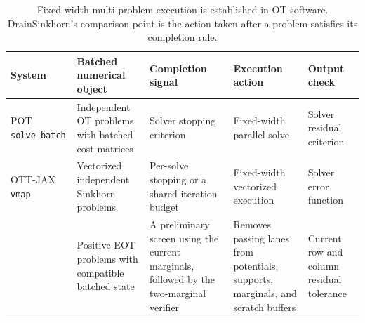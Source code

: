 \begin{table}[t]
\centering
\caption{Fixed-width multi-problem execution is established in OT software. DrainSinkhorn's comparison point is the action taken after a problem satisfies its completion rule.}
\label{tab:prior-systems}
\scriptsize
\setlength{\tabcolsep}{3.2pt}
\begin{tabular}{@{}p{}p{}p{}p{}p{}@{}}
\toprule
System & Batched numerical object & Completion signal & Execution action & Output check \\
\midrule
POT \texttt{solve\_batch} \citep{flamary2021pot,pot2025batch}
& Independent OT problems with batched cost matrices
& Solver stopping criterion
& Fixed-width parallel solve
& Solver residual criterion \\
OTT-JAX \texttt{vmap} \citep{cuturi2022ott}
& Vectorized independent Sinkhorn problems
& Per-solve stopping or a shared iteration budget
& Fixed-width vectorized execution
& Solver error function \\
\policy{}
& Positive EOT problems with compatible batched state
& A preliminary screen using the current marginals, followed by the two-marginal verifier
& Removes passing lanes from potentials, supports, marginals, and scratch buffers
& Current row and column residual tolerance \\
\bottomrule
\end{tabular}
\end{table}
